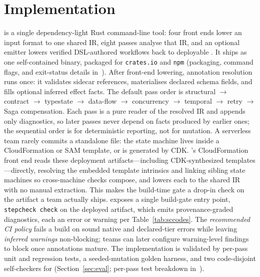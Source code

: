 \section{Implementation}
\label{sec:impl}

\tool{} is a single dependency-light Rust command-line tool: four front ends lower an input format
to one shared IR, eight passes analyse that IR, and an optional emitter lowers verified DSL-authored
workflows back to deployable \asl{}. It ships as one self-contained binary, packaged for
\texttt{crates.io} and \texttt{npm} (packaging, command flags, and exit-status details in~\cite{stepcheck-repo}).
After front-end lowering, annotation resolution runs once: it validates sidecar references,
materialises declared schema fields, and fills optional inferred effect facts. The default pass order
is structural $\to$ contract $\to$ typestate $\to$ data-flow $\to$ concurrency $\to$ temporal $\to$
retry $\to$ Saga compensation. Each pass is a pure reader of the resolved IR and appends only
diagnostics, so later passes never depend on facts produced by earlier ones; the sequential order is
for deterministic reporting, not for mutation.
A serverless team rarely commits a standalone \asl{} file: the state machine lives inside a
CloudFormation or SAM template, or is generated by CDK. \tool{}'s CloudFormation front end reads
these deployment artifacts---including CDK-synthesized templates---directly, resolving the embedded
template intrinsics and linking sibling state machines so cross-machine checks compose, and lowers
each to the shared IR with no manual extraction. This makes the build-time gate a drop-in check on
the artifact a team actually ships.
\tool{} exposes a single build-gate entry point, \texttt{stepcheck check} on the deployed artifact,
which emits provenance-graded diagnostics, each an error or warning per Table~\ref{tab:sccodes}. The
\emph{recommended CI policy} fails a build on sound native and declared-tier errors while leaving
\emph{inferred warnings} non-blocking; teams can later configure warning-level findings to block once
annotations mature.
The implementation is validated by per-pass unit and regression tests, a seeded-mutation golden
harness, and two code-disjoint self-checkers for  (Section~\ref{sec:eval}; per-pass test
breakdown in~\cite{stepcheck-repo}).
